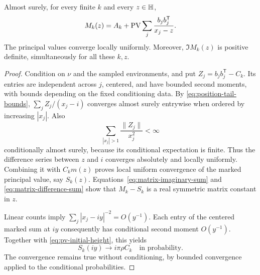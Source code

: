 \begin{proposition}\label{prop:marked-resolvent}
Almost surely, for every finite $k$ and every $z\in\mathbb H$,
\begin{equation}\label{eq:marked-resolvent}
 M_k(z)=A_k+\operatorname{PV}\sum_j\frac{b_jb_j^{\mathsf T}}{x_j-z}.
\end{equation}
The principal values converge locally uniformly. Moreover,
$\Im M_k(z)$ is positive definite, simultaneously for all these $k,z$.
\end{proposition}

\begin{proof}
Condition on $\nu$ and the sampled environments, and put
$Z_j=b_jb_j^{\mathsf T}-C_k$. Its entries are independent across $j$,
centered, and have bounded second moments, with bounds depending on
the fixed conditioning data. By \eqref{eq:position-tail-bounds},
$\sum_j Z_j/(x_j-i)$ converges almost surely entrywise when ordered by
increasing $|x_j|$. Also
\[
                  \sum_{|x_j|>1}\frac{\|Z_j\|}{x_j^2}<\infty
\]
conditionally almost surely, because its conditional expectation is
finite. Thus the difference series between $z$ and $i$ converges
absolutely and locally uniformly. Combining it with $C_km(z)$ proves
local uniform convergence of the marked principal value, say $S_k(z)$.
Equations~\eqref{eq:matrix-imaginary-sum} and
\eqref{eq:matrix-difference-sum} show that $M_k-S_k$ is a real
symmetric matrix constant in $z$.

Linear counts imply
$\sum_j|x_j-iy|^{-2}=O(y^{-1})$. Each entry of the centered marked
sum at $iy$ consequently has conditional second moment $O(y^{-1})$.
Together with \eqref{eq:pv-initial-height}, this yields
\begin{equation}\label{eq:marked-pv-height}
                         S_k(iy)\longrightarrow i\pi\rho C_k
                         \quad\text{in probability}.
\end{equation}
The convergence remains true without conditioning, by bounded
convergence applied to the conditional probabilities.


\end{proof}
